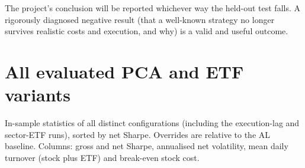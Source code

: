 \documentclass[11pt,a4paper]{article}
\begin{document}
The project's conclusion will be reported whichever way the held-out test falls. A rigorously
diagnosed negative result (that a well-known strategy no longer survives realistic costs and
execution, and why) is a valid and useful outcome.




\appendix
\section{All evaluated PCA and ETF variants}
\label{app:variants}
In-sample statistics of all \MPNVariants{} distinct configurations (including the execution-lag
and sector-ETF runs), sorted by net Sharpe. Overrides are relative to the AL baseline. Columns:
gross and net Sharpe, annualised net volatility, mean daily turnover (stock plus ETF) and
break-even stock cost.

{\small

}
\end{document}

